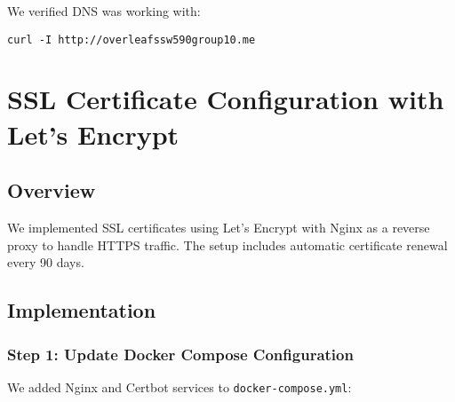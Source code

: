 We verified DNS was working with:

\begin{verbatim}
curl -I http://overleafssw590group10.me
\end{verbatim}

\section{SSL Certificate Configuration with Let's Encrypt}

\subsection{Overview}

We implemented SSL certificates using Let's Encrypt with Nginx as a reverse proxy to handle HTTPS traffic. The setup includes automatic certificate renewal every 90 days.

\subsection{Implementation}

\subsubsection{Step 1: Update Docker Compose Configuration}

We added Nginx and Certbot services to \texttt{docker-compose.yml}:

